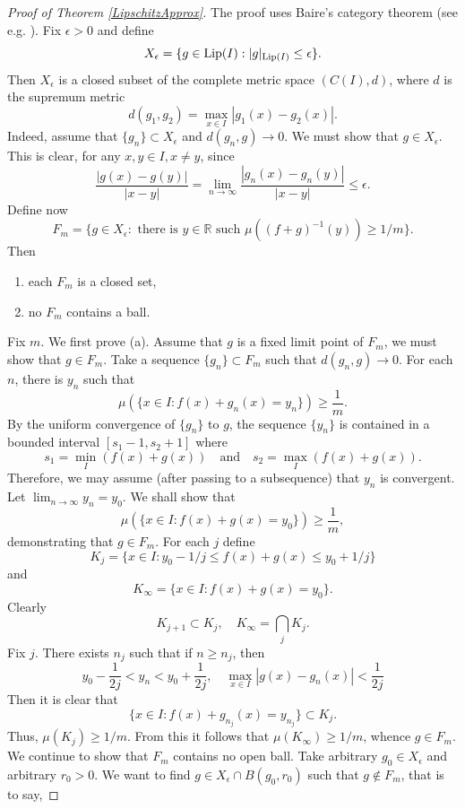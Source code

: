 \documentclass{amsart}
\numberwithin{equation}{section}
\begin{document}
\begin{proof}[Proof of Theorem \ref{LipschitzApprox}]
The proof uses Baire's category theorem (see e.g. \cite[Chapter 4]{ShSt11}). Fix $\epsilon>0$ and define 
\begin{equation}
    \nonumber
    X_\epsilon=\{g\in{\rm Lip}(I): |g|_{{\rm Lip}(I)}\le\epsilon\}.
\end{equation}
Then $X_\epsilon$ is a closed subset of the complete metric space $(C(I),d)$, where $d$ is the supremum metric
$$
d(g_1,g_2)=\max_{x\in I}|g_1(x)-g_2(x)|.
$$
Indeed, assume that $\{g_n\}\subset X_\epsilon$ and $d(g_n,g)\rightarrow0$. We must show that $g\in X_\epsilon$.
This is clear, for any $x,y\in I, x\neq y$, since
$$
\frac{|g(x)-g(y)|}{|x-y|}=\lim_{n\rightarrow\infty}\frac{|g_n(x)-g_n(y)|}{|x-y|}\le\epsilon.
$$
Define now
$$
F_m=\{g\in X_\epsilon: \text{ there is }y\in\mathbb{R}\text{ such }\mu((f+g)^{-1}(y))\ge 1/m\}.
$$
Then
\begin{enumerate}
    \item[(a)] each $F_m$ is a closed set,
    \item[(b)] no $F_m$ contains a ball.
\end{enumerate}
Fix $m$. We first prove (a). Assume that $g$ is a fixed limit point of $F_m$, we must show that $g\in F_m$. Take a sequence $\{g_n\}\subset F_m$ such that $d(g_n,g)\rightarrow0$. For each $n$, there is $y_n$ such that
\begin{equation}
    \nonumber
    \mu(\{x\in I:f(x)+g_n(x)=y_n\})\ge\frac{1}{m}.
\end{equation}
By the uniform convergence of $\{g_n\}$ to $g$, the sequence $\{y_n\}$ is contained in a bounded interval $[s_1-1,s_2+1]$ where 
$$
s_1=\min_I(f(x)+g(x))\quad\text{and}\quad s_2=\max_I(f(x)+g(x)).
$$
Therefore, we may assume (after passing to a subsequence) that $y_n$ is convergent. Let $\lim_{n\rightarrow\infty}y_n=y_0$. We shall show that
\begin{equation}
    \nonumber
    \mu(\{x\in I:f(x)+g(x)=y_0\})\ge\frac{1}{m},
\end{equation}
demonstrating that $g\in F_m$. For each $j$ define
$$
K_j=\{x\in I:y_0-1/j\le f(x)+g(x)\le y_0+1/j\}
$$
and 
$$
K_\infty=\{x\in I:f(x)+g(x)=y_0\}.
$$
Clearly 
$$
K_{j+1}\subset K_j,\quad K_\infty=\bigcap_jK_j.
$$
Fix $j$. There exists $n_j$ such that if $n\ge n_j$, then
$$
y_0-\frac{1}{2j}<y_n<y_0+\frac{1}{2j},\quad\max_{x\in I}|g(x)-g_n(x)|<\frac{1}{2j}
$$
Then it is clear that
$$
\{x\in I:f(x)+g_{n_j}(x)=y_{n_j}\}\subset K_j.
$$
Thus, $\mu(K_j)\ge1/m$. From this it follows that $\mu(K_\infty)\ge1/m$, whence $g\in F_m$. We continue to show that $F_m$ contains no open ball. Take arbitrary $g_0\in X_\epsilon$ and arbitrary $r_0>0$. We want to find $g\in X_\epsilon\cap B(g_0,r_0)$ such that $g\notin F_m$, that is to say,

\end{proof}
\end{document}
